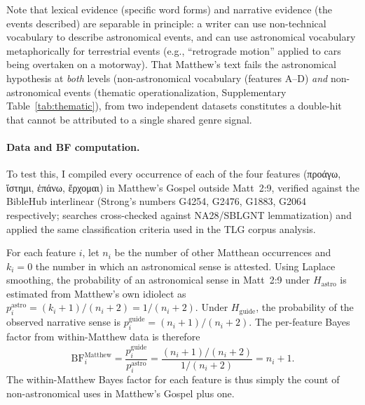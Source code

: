 \documentclass[11pt,a4paper]{article}
\newcommand{\grk}[1]{{\fontencoding{LGR}\selectfont #1}}
\newcommand{\grk}[1]{{\greekfont #1}}
\begin{document}
Note that lexical evidence (specific word forms) and narrative evidence (the
events described) are separable in principle: a writer can use non-technical
vocabulary to describe astronomical events, and can use astronomical vocabulary
metaphorically for terrestrial events (e.g., ``retrograde motion'' applied to
cars being overtaken on a motorway). That Matthew's text fails the astronomical
hypothesis at \emph{both} levels (non-astronomical vocabulary (features A--D)
\emph{and} non-astronomical events (thematic operationalization, Supplementary Table~\ref{tab:thematic}), from
two independent datasets constitutes a double-hit that cannot be attributed to
a single shared genre signal.

\paragraph{Data and BF computation.}

To test this, I compiled every occurrence of each of the four features
(\grk{προάγω}, \grk{ἵστημι}, \grk{ἐπάνω}, \grk{ἔρχομαι}) in Matthew's Gospel
outside Matt~2:9, verified against the BibleHub interlinear (Strong's numbers
G4254, G2476, G1883, G2064 respectively; searches cross-checked against
NA28/SBLGNT lemmatization) and applied the same classification criteria used in
the TLG corpus analysis.

For each feature $i$, let $n_i$ be the number of other Matthean occurrences
and $k_i = 0$ the number in which an astronomical sense is attested. Using
Laplace smoothing, the probability of an astronomical sense in Matt~2:9 under
$H_\text{astro}$ is estimated from Matthew's own idiolect as
$p_i^\text{astro} = (k_i+1)/(n_i+2) = 1/(n_i+2)$.
Under $H_\text{guide}$, the probability of the observed narrative sense is
$p_i^\text{guide} = (n_i+1)/(n_i+2)$.
The per-feature Bayes factor from within-Matthew data is therefore
\begin{equation}
  \mathrm{BF}_i^\text{Matthew} = \frac{p_i^\text{guide}}{p_i^\text{astro}}
    = \frac{(n_i+1)/(n_i+2)}{1/(n_i+2)} = n_i + 1.
  \label{eq:bf_matthew_i}
\end{equation}
The within-Matthew Bayes factor for each feature is thus simply the count of
non-astronomical uses in Matthew's Gospel plus one.
\end{document}
